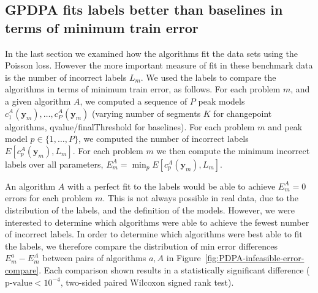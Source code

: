 \documentclass[twoside,11pt]{article}
\begin{document}
\subsection{GPDPA fits labels better than baselines in terms of minimum train error}
\label{sec:min-train-error}

In the last section we examined how the algorithms fit the data sets
using the Poisson loss. However the more important
measure of fit in these benchmark data is the number of incorrect
labels $L_m$. We used the labels to compare the algorithms in terms of
minimum train error, as follows.
For each problem $m$, and a given algorithm $A$, we computed a
sequence of $P$ peak models
$c^A_1(\mathbf y_m),\dots,c^A_P(\mathbf y_m)$ (varying number of
segments $K$ for changepoint algorithms, qvalue/finalThreshold for
baselines). For each problem $m$ and peak model $p\in\{1,\dots,P\}$,
we computed the number of incorrect labels
$E[c^A_p(\mathbf y_m), L_m]$. For each problem $m$ we then compute the
minimum incorrect labels over all parameters,
$E^A_m=\min_p E[c^A_p(\mathbf y_m), L_m]$. 

An algorithm $A$ with a perfect fit to the labels would be able to
achieve $E^A_m=0$ errors for each problem $m$. This is not always
possible in real data, due to the distribution of the labels, and the
definition of the models. However, we were interested to determine
which algorithms were able to achieve the fewest number of incorrect
labels. In order to determine which algorithms were best able to fit
the labels, we therefore compare the distribution of min error differences
$E_m^a-E_m^A$ between pairs of algorithms $a,A$ in
Figure~\ref{fig:PDPA-infeasible-error-compare}. Each comparison shown
results in a statistically significant difference ($\text{p-value}<10^{-4}$,
two-sided paired Wilcoxon signed rank test).
\end{document}
